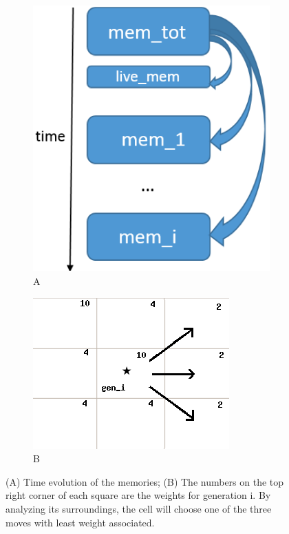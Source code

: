 \documentclass[a4paper,prd,twocolumn,nofootinbib,superscriptaddress,floatfix]{revtex4}
\begin{document}
\begin{figure}[H] 
  \begin{subfigure}[b]{0.5\linewidth}
    \centering
    \includegraphics[width=0.9\linewidth]{mem_scheme.png} 
  \caption{A}
    \label{fig:3a} 
    \vspace{4ex}
  \end{subfigure}%
  \begin{subfigure}[b]{0.5\linewidth}
    \centering
    \includegraphics[width=1.1\linewidth]{mem_move.png} 
    \caption{B}
    \label{fig:3b} 
    \vspace{4ex}
  \end{subfigure} 
  \caption{(A) Time evolution of the memories; (B) The numbers on the top right corner of each square are the weights for generation i. By analyzing its surroundings, the cell will choose one of the three moves with least weight associated.}
  \label{fig:3} 
\end{figure}
\end{document}
